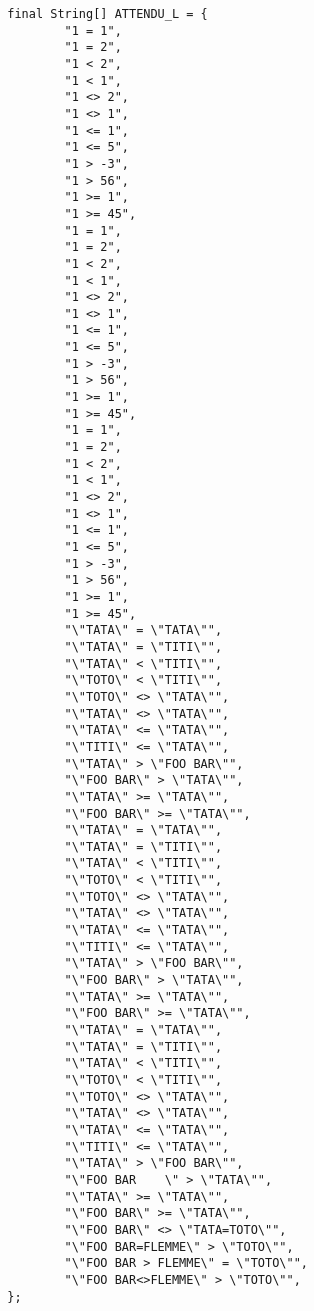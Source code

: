 \begin{enum}
\begin{verbatim}
        final String[] ATTENDU_L = {
                "1 = 1",
                "1 = 2",
                "1 < 2",
                "1 < 1",
                "1 <> 2",
                "1 <> 1",
                "1 <= 1",
                "1 <= 5",
                "1 > -3",
                "1 > 56",
                "1 >= 1",
                "1 >= 45",
                "1 = 1",
                "1 = 2",
                "1 < 2",
                "1 < 1",
                "1 <> 2",
                "1 <> 1",
                "1 <= 1",
                "1 <= 5",
                "1 > -3",
                "1 > 56",
                "1 >= 1",
                "1 >= 45",
                "1 = 1",
                "1 = 2",
                "1 < 2",
                "1 < 1",
                "1 <> 2",
                "1 <> 1",
                "1 <= 1",
                "1 <= 5",
                "1 > -3",
                "1 > 56",
                "1 >= 1",
                "1 >= 45",
                "\"TATA\" = \"TATA\"",
                "\"TATA\" = \"TITI\"",
                "\"TATA\" < \"TITI\"",
                "\"TOTO\" < \"TITI\"",
                "\"TOTO\" <> \"TATA\"",
                "\"TATA\" <> \"TATA\"",
                "\"TATA\" <= \"TATA\"",
                "\"TITI\" <= \"TATA\"",
                "\"TATA\" > \"FOO BAR\"",
                "\"FOO BAR\" > \"TATA\"",
                "\"TATA\" >= \"TATA\"",
                "\"FOO BAR\" >= \"TATA\"",
                "\"TATA\" = \"TATA\"",
                "\"TATA\" = \"TITI\"",
                "\"TATA\" < \"TITI\"",
                "\"TOTO\" < \"TITI\"",
                "\"TOTO\" <> \"TATA\"",
                "\"TATA\" <> \"TATA\"",
                "\"TATA\" <= \"TATA\"",
                "\"TITI\" <= \"TATA\"",
                "\"TATA\" > \"FOO BAR\"",
                "\"FOO BAR\" > \"TATA\"",
                "\"TATA\" >= \"TATA\"",
                "\"FOO BAR\" >= \"TATA\"",
                "\"TATA\" = \"TATA\"",
                "\"TATA\" = \"TITI\"",
                "\"TATA\" < \"TITI\"",
                "\"TOTO\" < \"TITI\"",
                "\"TOTO\" <> \"TATA\"",
                "\"TATA\" <> \"TATA\"",
                "\"TATA\" <= \"TATA\"",
                "\"TITI\" <= \"TATA\"",
                "\"TATA\" > \"FOO BAR\"",
                "\"FOO BAR    \" > \"TATA\"",
                "\"TATA\" >= \"TATA\"",
                "\"FOO BAR\" >= \"TATA\"",
                "\"FOO BAR\" <> \"TATA=TOTO\"",
                "\"FOO BAR=FLEMME\" > \"TOTO\"",
                "\"FOO BAR > FLEMME\" = \"TOTO\"",
                "\"FOO BAR<>FLEMME\" > \"TOTO\"",
        };
        

\end{verbatim}
\end{enum}
